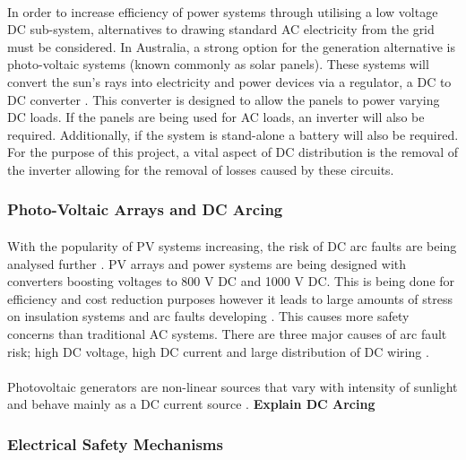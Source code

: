 \paragraph{}
In order to increase efficiency of power systems through utilising a low voltage DC sub-system, alternatives to drawing standard AC electricity from the grid must be considered. In Australia, a strong option for the generation alternative is photo-voltaic systems (known commonly as solar panels). These systems will convert the sun’s rays into electricity and power devices via a regulator, a DC to DC converter \cite{Pillay2004}. This converter is designed to allow the panels to power varying DC loads. If the panels are being used for AC loads, an inverter will also be required. Additionally, if the system is stand-alone a battery will also be required. For the purpose of this project, a vital aspect of DC distribution is the removal of the inverter allowing for the removal of losses caused by these circuits.   

\subsubsection{Photo-Voltaic Arrays and DC Arcing}

\paragraph{}
With the popularity of PV systems increasing, the risk of DC arc faults are being analysed further \cite{Spooner2008}. PV arrays and power systems are being designed with converters boosting voltages to 800 V DC and 1000 V DC. This is being done for efficiency and cost reduction purposes however it leads to large amounts of stress on insulation systems and arc faults developing \cite{Spooner2008}. This causes more safety concerns than traditional AC systems. There are three major causes of arc fault risk; high DC voltage, high DC current and large distribution of DC wiring \cite{website:DC-Arching}.

\paragraph{}
Photovoltaic generators are non-linear sources that vary with intensity of sunlight and behave mainly as a DC current source \cite{Ribeiro2009}. \textbf{Explain DC Arcing}        

\subsubsection{Electrical Safety Mechanisms}

